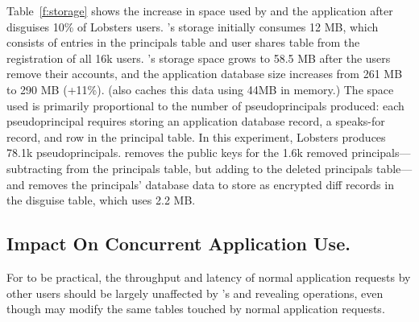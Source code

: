 %
Table~\ref{f:storage} shows the increase in space used by \sys and the
application after \sys disguises 10\% of Lobsters users. \sys's storage
initially consumes 12 MB, which consists of entries in the principals table and
user shares table from the registration of all 16k users.
%
\sys's storage space grows to 58.5 MB after the users remove their accounts, and
the application database size increases from 261 MB to 290 MB (+11\%).
%
(\sys also caches this data using 44MB in memory.)
%
The space used is primarily proportional to the number of pseudoprincipals
produced: each pseudoprincipal requires storing an application database record,
a speaks-for record, and row in the principal table.
%
In this experiment, Lobsters produces 78.1k pseudoprincipals.
%
%
%
%
\sys removes the public keys for the 1.6k removed principals---subtracting from
the principals table, but adding to the deleted principals table---and removes
the principals' database data to store as encrypted diff records in the disguise
table, which uses 2.2 MB.
%
%

\subsection{Impact On Concurrent Application Use.}
\label{s:eval-conc}

%
%
%
For \sys to be practical, the throughput and latency of normal application
requests by other users should be largely unaffected by \sys's \xxing and
revealing operations, even though \sys may modify the same tables touched by
normal application requests.
%
%

